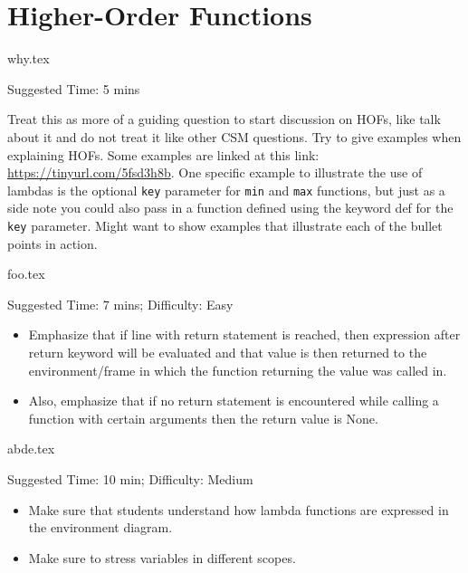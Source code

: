 \documentclass{exam}
\begin{document}
\section{Higher-Order Functions}
\begin{questions}
    {why.tex}
    \begin{questionmeta}
        Suggested Time: 5 mins
        
        Treat this as more of a guiding question to start discussion on HOFs, like talk about it and do not treat it like other CSM questions. Try to give examples when explaining HOFs. Some examples are linked at this link: \url{https://tinyurl.com/5fsd3h8b}.
        One specific example to illustrate the use of lambdas is the optional \lstinline{key} parameter for \lstinline{min} and \lstinline{max} functions, but just as a side note you could also pass in a function defined using the keyword def for the \lstinline{key} parameter.
        Might want to show examples that illustrate each of the bullet points in action. 
    \end{questionmeta}
    
    {foo.tex}
    \begin{questionmeta}
        Suggested Time: 7 mins; Difficulty: Easy
        \begin{itemize}
            \item Emphasize that if line with return statement is reached, then expression after return keyword will be evaluated and that value is then returned to the environment/frame in which the function returning the value was called in. 
            \item Also, emphasize that if no return statement is encountered while calling a function with certain arguments then the return value is None.
        \end{itemize}
    \end{questionmeta}

    {abde.tex}
    \begin{questionmeta}
        Suggested Time: 10 min; Difficulty: Medium
        \begin{itemize}
            \item Make sure that students understand how lambda functions are expressed in the environment diagram.
            \item Make sure to stress variables in different scopes.
        \end{itemize}
      \end{questionmeta}


\end{questions}
\end{document}

